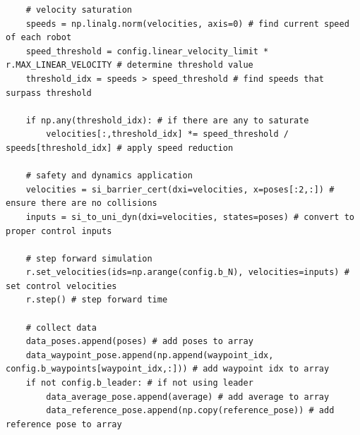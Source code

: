 \documentclass[11pt]{article}
\begin{document}
\begin{verbatim}
    # velocity saturation
    speeds = np.linalg.norm(velocities, axis=0) # find current speed of each robot
    speed_threshold = config.linear_velocity_limit * r.MAX_LINEAR_VELOCITY # determine threshold value
    threshold_idx = speeds > speed_threshold # find speeds that surpass threshold
        
    if np.any(threshold_idx): # if there are any to saturate
        velocities[:,threshold_idx] *= speed_threshold / speeds[threshold_idx] # apply speed reduction

    # safety and dynamics application
    velocities = si_barrier_cert(dxi=velocities, x=poses[:2,:]) # ensure there are no collisions
    inputs = si_to_uni_dyn(dxi=velocities, states=poses) # convert to proper control inputs

    # step forward simulation
    r.set_velocities(ids=np.arange(config.b_N), velocities=inputs) # set control velocities
    r.step() # step forward time

    # collect data
    data_poses.append(poses) # add poses to array
    data_waypoint_pose.append(np.append(waypoint_idx, config.b_waypoints[waypoint_idx,:])) # add waypoint idx to array
    if not config.b_leader: # if not using leader
        data_average_pose.append(average) # add average to array
        data_reference_pose.append(np.copy(reference_pose)) # add reference pose to array
\end{verbatim}

\clearpage
\end{document}
